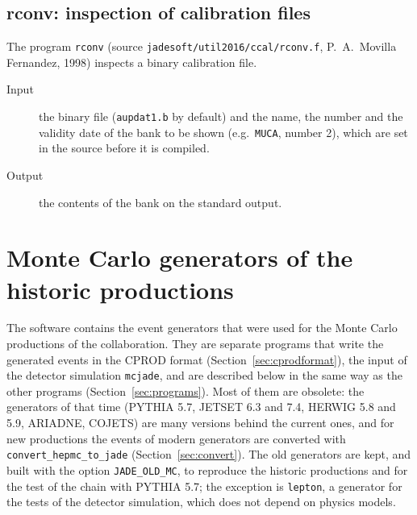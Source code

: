 \subsection{rconv: inspection of calibration files}
The program \texttt{rconv} (source \texttt{jadesoft/\allowbreak{}util2016/\allowbreak{}ccal/\allowbreak{}rconv.f}, P.~A.~Movilla Fernandez, 1998) inspects a binary calibration file.
\begin{description}
\item[Input] the binary file (\texttt{aupdat1.b} by default) and the name, the number and the validity date of the bank to be shown (e.g.\ \texttt{MUCA}, number 2), which are set in the
source before it is compiled.
\item[Output] the contents of the bank on the standard output.
\end{description}

\section{Monte Carlo generators of the historic productions}
\label{sec:generators}

The software contains the event generators that were used for the Monte Carlo productions of the collaboration. They are separate programs that write the generated events in the CPROD format
(Section~\ref{sec:cprodformat}), the input of the detector simulation \texttt{mcjade}, and are described below in the same way as the other programs (Section~\ref{sec:programs}). Most of them are obsolete:
the generators of that time (PYTHIA 5.7, JETSET 6.3 and 7.4, HERWIG 5.8 and 5.9, ARIADNE, COJETS) are many versions behind the current ones, and for new productions the events of modern generators are
converted with \texttt{convert\_hepmc\_to\_jade} (Section~\ref{sec:convert}). The old generators are kept, and built with the option \texttt{JADE\_OLD\_MC}, to reproduce the historic productions and for the
test of the chain with PYTHIA 5.7; the exception is \texttt{lepton}, a generator for the tests of the detector simulation, which does not depend on physics models.

